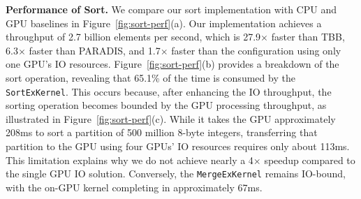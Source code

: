\noindent
\textbf{Performance of Sort.}
We compare our sort implementation with CPU and GPU baselines in Figure~\ref{fig:sort-perf}(a). 
Our implementation achieves a throughput of 2.7 billion elements per second, which is 27.9$\times$ faster than TBB, 6.3$\times$ faster than PARADIS, and 1.7$\times$ faster than the configuration using only one GPU's IO resources. 
Figure~\ref{fig:sort-perf}(b) provides a breakdown of the sort operation, revealing that 65.1\% of the time is consumed by the \texttt{SortExKernel}. 
This occurs because, after enhancing the IO throughput, the sorting operation becomes bounded by the GPU processing throughput, as illustrated in Figure~\ref{fig:sort-perf}(c). 
While it takes the GPU approximately 208ms to sort a partition of 500 million 8-byte integers, transferring that partition to the GPU using four GPUs' IO resources requires only about 113ms. 
This limitation explains why we do not achieve nearly a 4$\times$ speedup compared to the single GPU IO solution. 
Conversely, the \texttt{MergeExKernel} remains IO-bound, with the on-GPU kernel completing in approximately 67ms.

\begin{comment}
We compare our sort implementation with the CPU and GPU baselines in Figure~\ref{fig:sort-perf}(a).
Our sort implementation achieves 2.67B elements per second throughput, which is 27.9$\times$ compared to TBB, 6.3$\times$ compared to PARADIS, and 1.7$\times$ compared to the case using only one GPU's IO.
Figure~\ref{fig:sort-perf}(b) is the time breakdown of the sort operation, where 65.1\% of time is spent on the \texttt{SortExOperation}.
The reason is that after we enhance the IO throughput, sorting the array by partition is bounded by GPU-processing throughput, which is showcased in Figure~\ref{fig:sort-perf}(c).
It takes the GPU ~208ms to sort a partition of 500M 8-byte integers, but only ~113ms to transfer that partition to GPU using 4 GBUs' IO resources.
This is why we do not achieve close to 4$\times$ speedup compared to the single GPU IO solution.
On the other hand, \texttt{MergeExOperation} is still IO-bound, which finishes the on-GPU kernel in ~67ms.
\end{comment}


